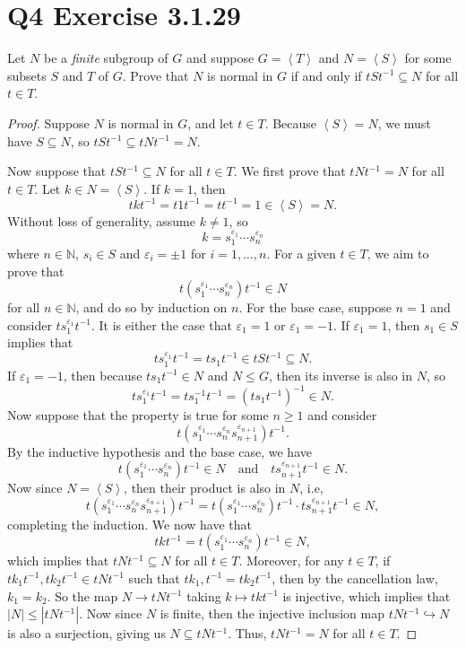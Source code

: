 \documentclass[12pt]{article}
\newenvironment{problem}
    {\begin{lrbox}{\mybox}\begin{minipage}{\textwidth-10pt}}
    {\end{minipage}\end{lrbox}\framebox[6.5in]{\usebox{\mybox}}}
\newcommand{\isp}[1]{\quad\text{#1}\quad}
\newcommand{\<}{\left\langle}
\renewcommand{\>}{\right\rangle}
\newcommand{\N}{\mathbb{N}}
\let\eps\varepsilon
\begin{document}
\newpage
\section*{Q4 Exercise 3.1.29}
\begin{problem}
    Let $N$ be a \emph{finite} subgroup of $G$ and suppose $G=\<T\>$ and $N=\<S\>$ for some subsets $S$ and $T$ of $G$. Prove that $N$ is normal in $G$ if and only if $tSt^{-1} \subseteq N$ for all $t\in T$.
\end{problem}

\begin{proof}
    Suppose $N$ is normal in $G$, and let $t\in T$. Because $\<S\>=N$, we must have $S\subseteq N$, so $tSt^{-1}\subseteq tNt^{-1} =  N$.
    
    Now suppose that $tSt^{-1} \subseteq N$ for all $t\in T$. We first prove that $tNt^{-1} = N$ for all $t\in T$. Let $k\in N=\<S\>$. If $k=1$, then
    \[tkt^{-1} = t1t^{-1} = tt^{-1} =1 \in \<S\> = N.\]
    Without loss of generality, assume $k\ne1$, so
    \[k = s_1^{\eps_1}\cdots s_n^{\eps_n}\]
    where $n\in\N$, $s_i\in S$ and $\eps_i=\pm1$ for $i=1,\dots,n$. For a given $t\in T$, we aim to prove that
    \[t(s_1^{\eps_1}\cdots s_n^{\eps_n})t^{-1} \in N\]
    for all $n\in\N$, and do so by induction on $n$. For the base case, suppose $n=1$ and consider $ts_1^{\eps_1}t^{-1}$. It is either the case that $\eps_1=1$ or $\eps_1 = -1$. If $\eps_1 = 1$, then $s_1\in S$ implies that
    \[ts_1^{\eps_1}t^{-1} = ts_1 t^{-1} \in tSt^{-1} \subseteq N.\]
    If $\eps_1 = -1$, then because $ts_1t^{-1}\in N$ and $N\leq G$, then its inverse is also in $N$, so
    \[ts_1^{\eps_1}t^{-1} = ts_1^{-1}t^{-1} = (ts_1t^{-1})^{-1} \in N.\]
    Now suppose that the property is true for some $n\geq 1$ and consider
    \[t(s_1^{\eps_1}\cdots s_n^{\eps_n}s_{n+1}^{\eps_{n+1}})t^{-1}.\]
    By the inductive hypothesis and the base case, we have
    \[t(s_1^{\eps_1}\cdots s_n^{\eps_n})t^{-1} \in N \isp{and} ts_{n+1}^{\eps_{n+1}}t^{-1}\in N.\]
    Now since $N=\<S\>$, then their product is also in $N$, i.e,
    \[t(s_1^{\eps_1}\cdots s_n^{\eps_n}s_{n+1}^{\eps_{n+1}})t^{-1} = t(s_1^{\eps_1}\cdots s_n^{\eps_n})t^{-1}\cdot ts_{n+1}^{\eps_{n+1}}t^{-1} \in N,\]
    completing the induction. We now have that
    \[tkt^{-1} = t(s_1^{\eps_1}\cdots s_n^{\eps_n})t^{-1} \in N,\]
    which implies that $tNt^{-1} \subseteq N$ for all $t\in T$. Moreover, for any $t\in T$, if $tk_1t^{-1},tk_2t^{-1} \in tNt^{-1}$ such that $tk_1,t^{-1} = tk_2t^{-1}$, then by the cancellation law, $k_1=k_2$. So the map $N \to tNt^{-1}$ taking $k\mapsto tkt^{-1}$ is injective, which implies that $|N| \leq |tNt^{-1}|$. Now since $N$ is finite, then the injective inclusion map $tNt^{-1} \hookrightarrow N$ is also a surjection, giving us $N\subseteq tNt^{-1}$. Thus, $tNt^{-1} = N$ for all $t\in T$.
    

\end{proof}
\end{document}

